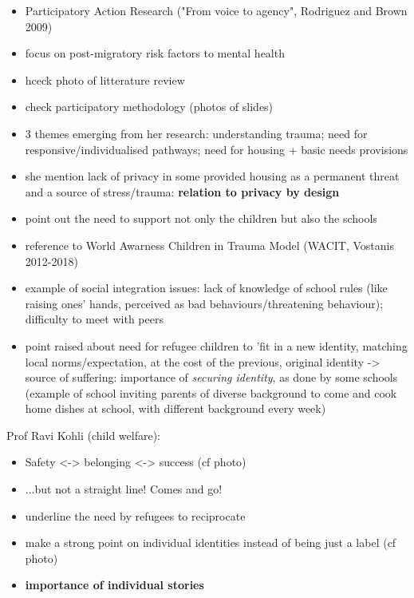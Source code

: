 \documentclass[11pt]{article}
\begin{document}
\begin{itemize}
    \item Participatory Action Research ("From voice to agency", Rodriguez and
        Brown 2009)
    \item focus on post-migratory risk factors to mental health
    \item hceck photo of litterature review
    \item check participatory methodology (photos of slides)
    \item 3 themes emerging from her research: understanding trauma; need for
        responsive/individualised pathways; need for housing + basic needs
        provisions
    \item she mention lack of privacy in some provided housing as a permanent
        threat and a source of stress/trauma: \textbf{relation to privacy by
        design}
    \item point out the need to support not only the children but also the
        schools
    \item reference to World Awarness Children in Trauma Model (WACIT, Vostanis
        2012-2018)
    \item example of social integration issues: lack of knowledge of school
        rules (like raising ones' hands, perceived as bad behaviours/threatening
        behaviour); difficulty to meet with peers
    \item point raised about need for refugee children to 'fit in a new
        identity, matching local norms/expectation, at the cost of the previous,
        original identity -> source of suffering: importance of \emph{securing
        identity}, as done by some schools (example of school inviting parents
        of diverse background to come and cook home dishes at school, with
        different background every week)
\end{itemize}


Prof Ravi Kohli (child welfare):

\begin{itemize}
    \item Safety <-> belonging <-> success (cf photo)
    \item ...but not a straight line! Comes and go!
    \item underline the need by refugees to reciprocate
    \item make a strong point on individual identities instead of being just a label (cf
        photo)
    \item \textbf{importance of individual stories}
\end{itemize}
\end{document}
